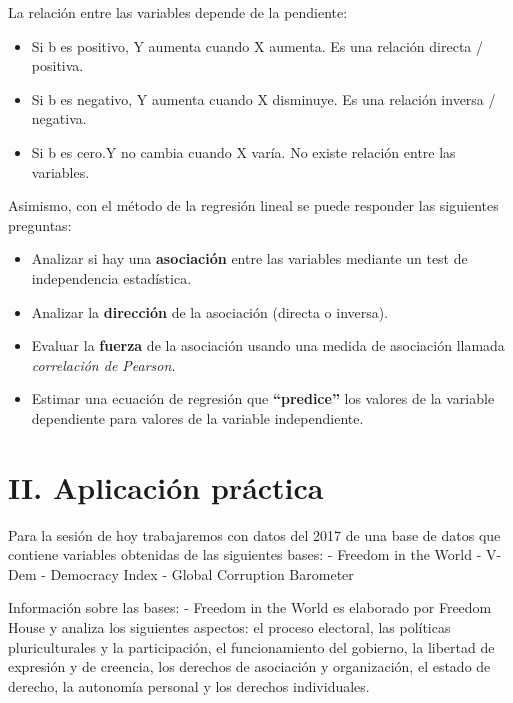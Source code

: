 \documentclass[
]{article}
\begin{document}
La relación entre las variables depende de la pendiente:

\begin{itemize}
\item
  Si b es positivo, Y aumenta cuando X aumenta. Es una relación directa
  / positiva.
\item
  Si b es negativo, Y aumenta cuando X disminuye. Es una relación
  inversa / negativa.
\item
  Si b es cero.Y no cambia cuando X varía. No existe relación entre las
  variables.
\end{itemize}

Asimismo, con el método de la regresión lineal se puede responder las
siguientes preguntas:

\begin{itemize}
\item
  Analizar si hay una \textbf{asociación} entre las variables mediante
  un test de independencia estadística.
\item
  Analizar la \textbf{dirección} de la asociación (directa o inversa).
\item
  Evaluar la \textbf{fuerza} de la asociación usando una medida de
  asociación llamada \emph{correlación de Pearson}.
\item
  Estimar una ecuación de regresión que \textbf{``predice''} los valores
  de la variable dependiente para valores de la variable independiente.
\end{itemize}

\hypertarget{ii.-aplicaciuxf3n-pruxe1ctica}{%
\section{\texorpdfstring{\textbf{II. Aplicación
práctica}}{II. Aplicación práctica}}\label{ii.-aplicaciuxf3n-pruxe1ctica}}

Para la sesión de hoy trabajaremos con datos del 2017 de una base de
datos que contiene variables obtenidas de las siguientes bases: -
Freedom in the World - V-Dem - Democracy Index - Global Corruption
Barometer

Información sobre las bases: - Freedom in the World es elaborado por
Freedom House y analiza los siguientes aspectos: el proceso electoral,
las políticas pluriculturales y la participación, el funcionamiento del
gobierno, la libertad de expresión y de creencia, los derechos de
asociación y organización, el estado de derecho, la autonomía personal y
los derechos individuales.
\end{document}
